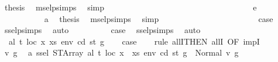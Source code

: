\begin{isabellebody}
\ {\isacharquery}{\kern0pt}thesis\ \isamarkupfalse%
\ msel{\isachardot}{\kern0pt}psimps{\isacharparenleft}{\kern0pt}{}{\isacharparenright}{\kern0pt}\ \isamarkupfalse%
\ simp\isanewline
\ \ \ \ \ \ \ \ \ \ \isamarkupfalse%
\isanewline
\ \ \ \ \ \ \ \ \isamarkupfalse%
\isanewline
\ \ \ \ \ \ \isamarkupfalse%
\isanewline
\ \ \ \ \ \ \ \ \isamarkupfalse%
\ {\isacharparenleft}{\kern0pt}e\ {\isacharunderscore}{\kern0pt}{\isacharparenright}{\kern0pt}\isanewline
\ \ \ \ \ \ \ \ \isamarkupfalse%
\ {}\ a{}\ \isamarkupfalse%
\ {\isacharquery}{\kern0pt}thesis\ \isamarkupfalse%
\ msel{\isachardot}{\kern0pt}psimps{\isacharparenleft}{\kern0pt}{}{\isacharparenright}{\kern0pt}\ \isamarkupfalse%
\ simp\isanewline
\ \ \ \ \ \ \isamarkupfalse%
\isanewline
\ \ \ \ \isamarkupfalse%
\isanewline
\ \ \isamarkupfalse%
\isanewline
{}\isamarkupfalse%
\isanewline
\ \ \isamarkupfalse%
\ {}\isanewline
\ \ \isamarkupfalse%
\ \isamarkupfalse%
\ {\isacharquery}{\kern0pt}case\ \isamarkupfalse%
\ ssel{\isachardot}{\kern0pt}psimps{\isacharparenleft}{\kern0pt}{}{\isacharparenright}{\kern0pt}\ \isamarkupfalse%
\ auto\isanewline
{}\isamarkupfalse%
\isanewline
\ \ \isamarkupfalse%
\ {}\isanewline
\ \ \isamarkupfalse%
\ \isamarkupfalse%
\ {\isacharquery}{\kern0pt}case\ \isamarkupfalse%
\ ssel{\isachardot}{\kern0pt}psimps{\isacharparenleft}{\kern0pt}{}{\isacharparenright}{\kern0pt}\ \isamarkupfalse%
\ auto\isanewline
{}\isamarkupfalse%
\isanewline
\ \ \isamarkupfalse%
\ {\isacharparenleft}{\kern0pt}{}\ al\ t\ loc\ x\ xs\ env\ cd\ st\ g{\isacharparenright}{\kern0pt}\isanewline
\ \ \isamarkupfalse%
\ {\isacharquery}{\kern0pt}case\isanewline
\ \ \isamarkupfalse%
\ {\isacharparenleft}{\kern0pt}rule\ allI{\isacharbrackleft}{\kern0pt}THEN\ allI{\isacharcomma}{\kern0pt}\ OF\ impI{\isacharbrackright}{\kern0pt}{\isacharparenright}{\kern0pt}\isanewline
\ \ \ \ \isamarkupfalse%
\ v{}{\isacharprime}{\kern0pt}\ g{}{\isacharprime}{\kern0pt}\ \isamarkupfalse%
\ a{}{\isacharcolon}{\kern0pt}\ {\isachardoublequoteopen}ssel\ {\isacharparenleft}{\kern0pt}STArray\ al\ t{\isacharparenright}{\kern0pt}\ loc\ {\isacharparenleft}{\kern0pt}x\ {\isacharhash}{\kern0pt}\ xs{\isacharparenright}{\kern0pt}\ env\ cd\ st\ g\ {\isacharequal}{\kern0pt}\ Normal\ {\isacharparenleft}{\kern0pt}v{}{\isacharprime}{\kern0pt}{\isacharcomma}{\kern0pt}\ g{}{\isacharprime}{\kern0pt}{\isacharparenright}{\kern0pt}{\isachardoublequoteclose}\isanewline

\end{isabellebody}
